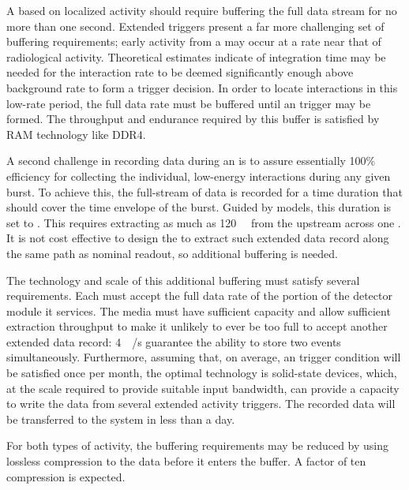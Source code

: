 \begin{itemize}
A  based on localized
activity should require buffering the full data stream for no more than one second.
Extended triggers present a far more challenging set of buffering
requirements; 
early activity from a  may occur at a rate near that of radiological activity.
Theoretical estimates indicate \snbpretime of integration time may be needed for the
 interaction rate to be deemed significantly enough above
background rate to form a trigger decision.
In order to locate interactions in this low-rate period, the full data rate must be buffered until an  trigger may be formed.
The throughput and endurance required by this buffer is satisfied by RAM technology like DDR4.

A second challenge in recording data during an  is to assure
essentially 100\% efficiency for collecting the individual, low-energy
interactions during any given  burst. 
To achieve this, the full-stream of data is recorded for a time duration that should cover the time envelope of the burst.
Guided by  models, this duration is set to \snbtime.
This requires extracting as much as \SI{120}{\tera\byte} from the  upstream  across one 
.
It is not cost effective to design the  to extract such
extended data record along the same path as nominal readout, so
additional buffering is needed.

The technology and scale of this additional buffering must satisfy several requirements. 
Each  must accept the full data rate of the portion of the detector module it services.
The media must have sufficient capacity and allow sufficient extraction throughput to make it unlikely to ever be too full to accept another extended data record: \SI{4}{\tera\bit/\second} guarantee the ability to store two  events simultaneously.
Furthermore, assuming that, on average, an  trigger condition will be
satisfied once per month, the optimal technology is
solid-state  devices, which, at the scale required to provide suitable input bandwidth, can provide a capacity to write the data from several extended activity triggers. The recorded data will be transferred to the  system in less than a day.

For both types of activity, the buffering requirements may be reduced by
using lossless compression to the data before it enters the buffer. A
factor of ten compression is expected\cite{dpcompression}.

\end{itemize}




